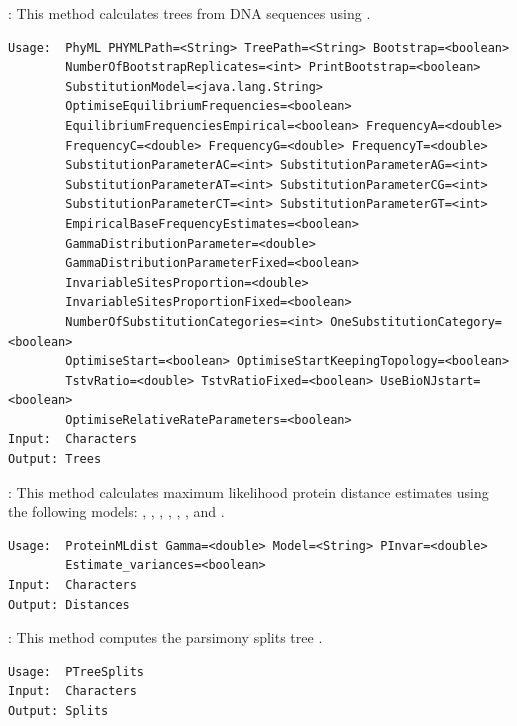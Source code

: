 \documentclass[11pt]{article}
\begin{document}
{}:
This method calculates  trees from DNA sequences using
 \cite{PhyML}.
\begin{verbatim}
Usage:  PhyML PHYMLPath=<String> TreePath=<String> Bootstrap=<boolean>
        NumberOfBootstrapReplicates=<int> PrintBootstrap=<boolean>
        SubstitutionModel=<java.lang.String>
        OptimiseEquilibriumFrequencies=<boolean>
        EquilibriumFrequenciesEmpirical=<boolean> FrequencyA=<double>
        FrequencyC=<double> FrequencyG=<double> FrequencyT=<double>
        SubstitutionParameterAC=<int> SubstitutionParameterAG=<int>
        SubstitutionParameterAT=<int> SubstitutionParameterCG=<int>
        SubstitutionParameterCT=<int> SubstitutionParameterGT=<int>
        EmpiricalBaseFrequencyEstimates=<boolean>
        GammaDistributionParameter=<double>
        GammaDistributionParameterFixed=<boolean>
        InvariableSitesProportion=<double>
        InvariableSitesProportionFixed=<boolean>
        NumberOfSubstitutionCategories=<int> OneSubstitutionCategory=<boolean>
        OptimiseStart=<boolean> OptimiseStartKeepingTopology=<boolean>
        TstvRatio=<double> TstvRatioFixed=<boolean> UseBioNJstart=<boolean>
        OptimiseRelativeRateParameters=<boolean>
Input:  Characters
Output: Trees
\end{verbatim}

{}:
This method calculates maximum likelihood protein distance estimates
using the following models:
, ,
, , , ,
 and 
\cite{SOWH1996}.

\begin{verbatim}
Usage:  ProteinMLdist Gamma=<double> Model=<String> PInvar=<double>
        Estimate_variances=<boolean>
Input:  Characters
Output: Distances
\end{verbatim}

{}:
This method computes the parsimony splits tree \cite{BandeltDress92}.
\begin{verbatim}
Usage:  PTreeSplits
Input:  Characters
Output: Splits
\end{verbatim}

\end{document}
